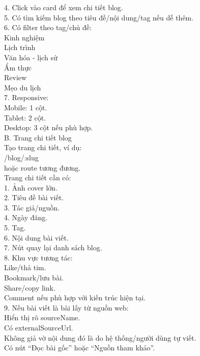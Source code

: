 \begin{enumerate}
4. Click vào card để xem chi tiết blog. \\
5. Có tìm kiếm blog theo tiêu đề/nội dung/tag nếu dễ thêm. \\
6. Có filter theo tag/chủ đề: \\
\* Kinh nghiệm \\
\* Lịch trình \\
\* Văn hóa - lịch sử \\
\* Ẩm thực \\
\* Review \\
\* Mẹo du lịch \\

7. Responsive: \\
\* Mobile: 1 cột. \\
\* Tablet: 2 cột. \\
\* Desktop: 3 cột nếu phù hợp. \\


B. Trang chi tiết blog \\
Tạo trang chi tiết, ví dụ: \\
\* /blog/:slug \\
      hoặc route tương đương. \\


Trang chi tiết cần có: \\

1. Ảnh cover lớn. \\
2. Tiêu đề bài viết. \\
3. Tác giả/nguồn. \\
4. Ngày đăng. \\
5. Tag. \\
6. Nội dung bài viết. \\
7. Nút quay lại danh sách blog. \\
8. Khu vực tương tác: \\
\* Like/thả tim. \\
\* Bookmark/lưu bài. \\
\* Share/copy link. \\
\* Comment nếu phù hợp với kiến trúc hiện tại. \\

9. Nếu bài viết là bài lấy từ nguồn web: \\
\* Hiển thị rõ sourceName. \\
\* Có externalSourceUrl. \\
\* Không giả vờ nội dung đó là do hệ thống/người dùng tự viết. \\
\* Có nút “Đọc bài gốc” hoặc “Nguồn tham khảo”. \\


\end{enumerate}
